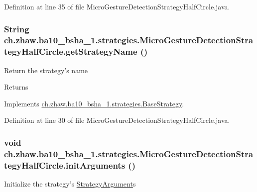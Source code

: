 Definition at line 35 of file MicroGestureDetectionStrategyHalfCircle.java.\hypertarget{classch_1_1zhaw_1_1ba10__bsha__1_1_1strategies_1_1MicroGestureDetectionStrategyHalfCircle_ab8f20632c110877b3173a3ca6c673bc1}{
\subsubsection[{getStrategyName}]{\setlength{\rightskip}{0pt plus 5cm}String ch.zhaw.ba10\_\-bsha\_\-1.strategies.MicroGestureDetectionStrategyHalfCircle.getStrategyName ()}}
\label{classch_1_1zhaw_1_1ba10__bsha__1_1_1strategies_1_1MicroGestureDetectionStrategyHalfCircle_ab8f20632c110877b3173a3ca6c673bc1}
Return the strategy's name

\begin{DoxyReturn}{Returns}

\end{DoxyReturn}


Implements \hyperlink{classch_1_1zhaw_1_1ba10__bsha__1_1_1strategies_1_1BaseStrategy_aa0ebed55eed45409bad13d43a0058780}{ch.zhaw.ba10\_\-bsha\_\-1.strategies.BaseStrategy}.

Definition at line 30 of file MicroGestureDetectionStrategyHalfCircle.java.\hypertarget{classch_1_1zhaw_1_1ba10__bsha__1_1_1strategies_1_1MicroGestureDetectionStrategyHalfCircle_a15793e039b14536d9ddb8dd23e839eac}{
\subsubsection[{initArguments}]{\setlength{\rightskip}{0pt plus 5cm}void ch.zhaw.ba10\_\-bsha\_\-1.strategies.MicroGestureDetectionStrategyHalfCircle.initArguments ()}}
\label{classch_1_1zhaw_1_1ba10__bsha__1_1_1strategies_1_1MicroGestureDetectionStrategyHalfCircle_a15793e039b14536d9ddb8dd23e839eac}
Initialize the strategy's \hyperlink{classch_1_1zhaw_1_1ba10__bsha__1_1_1StrategyArgument}{StrategyArgument}s 

